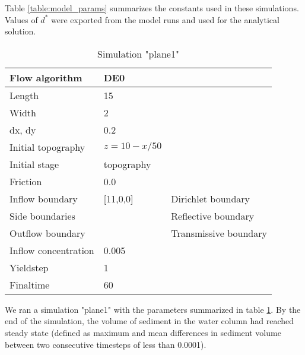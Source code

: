 \documentclass[11pt]{article}
\begin{document}
Table \ref{table:model_params} summarizes the constants used in these simulations. Values of $d^*$ were exported from the model runs and used for the analytical solution.



\begin{table}[]
\centering
\caption{Simulation "plane1"}
\label{table:plane1_params}
\begin{tabular}{|l|l|l|}
\hline
Flow algorithm       & DE0             &                       \\ \hline
Length               & 15              &                       \\ \hline
Width                & 2               &                       \\ \hline
dx, dy               & 0.2             &                       \\ \hline
Initial topography   & $z = 10 - x/50$ &                       \\ \hline
Initial stage        & topography      &                       \\ \hline
Friction             & 0.0             &                       \\ \hline
Inflow boundary      & {[}11,0,0{]}    & Dirichlet boundary    \\ \hline
Side boundaries      &                 & Reflective boundary   \\ \hline
Outflow boundary     &                 & Transmissive boundary \\ \hline
Inflow concentration & 0.005           &                       \\ \hline
Yieldstep            & 1               &                       \\ \hline
Finaltime            & 60              &                       \\ \hline
\end{tabular}
\end{table}


We ran a simulation "plane1" with the parameters summarized in table \ref{table:plane1_params}. By the end of the simulation, the volume of sediment in the water column had reached steady state (defined as maximum and mean differences in sediment volume between two consecutive timesteps of less than 0.0001).
\end{document}
